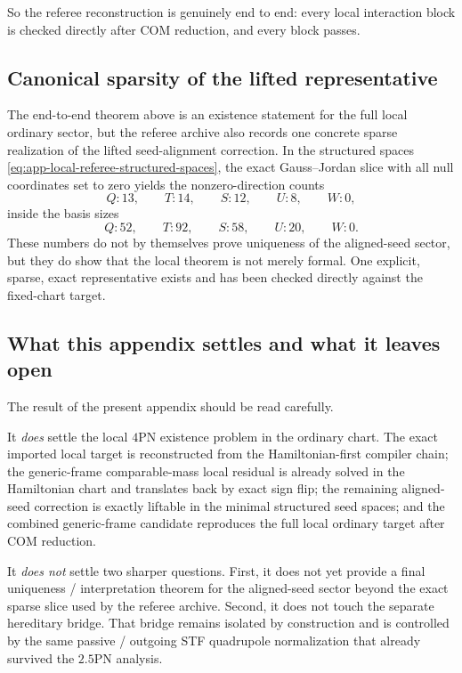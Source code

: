 \documentclass[11pt]{article}
\begin{document}
So the referee reconstruction is genuinely end to end: every local interaction
block is checked directly after COM reduction, and every block passes.

\subsection{Canonical sparsity of the lifted representative}
\label{app:local-referee-reconstruction-sparsity}

The end-to-end theorem above is an existence statement for the full local
ordinary sector, but the referee archive also records one concrete sparse
realization of the lifted seed-alignment correction.  In the structured spaces
\eqref{eq:app-local-referee-structured-spaces}, the exact Gauss--Jordan slice
with all null coordinates set to zero yields the nonzero-direction counts
\begin{equation}
Q:13,
\qquad
T:14,
\qquad
S:12,
\qquad
U:8,
\qquad
W:0,
\label{eq:app-local-referee-sparse-counts}
\end{equation}
inside the basis sizes
\begin{equation}
Q:52,
\qquad
T:92,
\qquad
S:58,
\qquad
U:20,
\qquad
W:0.
\label{eq:app-local-referee-basis-sizes}
\end{equation}
These numbers do not by themselves prove uniqueness of the aligned-seed sector,
but they do show that the local theorem is not merely formal.  One explicit,
sparse, exact representative exists and has been checked directly against the
fixed-chart target.

\subsection{What this appendix settles and what it leaves open}
\label{app:local-referee-reconstruction-status}

The result of the present appendix should be read carefully.

It \emph{does} settle the local $4$PN existence problem in the ordinary chart.
The exact imported local target is reconstructed from the Hamiltonian-first
compiler chain; the generic-frame comparable-mass local residual is already
solved in the Hamiltonian chart and translates back by exact sign flip; the
remaining aligned-seed correction is exactly liftable in the minimal structured
seed spaces; and the combined generic-frame candidate reproduces the full local
ordinary target after COM reduction.

It \emph{does not} settle two sharper questions.
First, it does not yet provide a final uniqueness / interpretation theorem for
the aligned-seed sector beyond the exact sparse slice used by the referee
archive.  Second, it does not touch the separate hereditary bridge.  That bridge
remains isolated by construction and is controlled by the same passive / outgoing
STF quadrupole normalization that already survived the $2.5$PN analysis.
\end{document}
